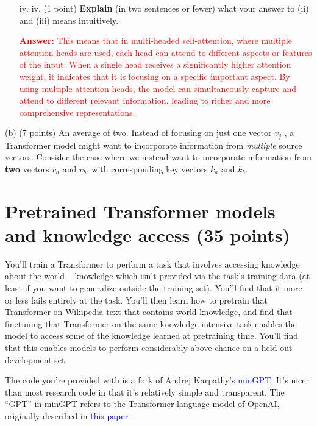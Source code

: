 \documentclass[letterpaper,12pt]{article}
\begin{document}
		\begin{itemize}
			\item [iv.]
			iv. (1 point) \textbf{Explain} (in two sentences or fewer) what your answer to (ii) and (iii) means intuitively.
			
			\textcolor{red}{\textbf{Answer:} This means that in multi-headed self-attention, where multiple attention heads are used, each head can attend to different aspects or features of the input. When a single head receives a significantly higher attention weight, it indicates that it is focusing on a specific important aspect. By using multiple attention heads, the model can simultaneously capture and attend to different relevant information, leading to richer and more comprehensive representations.}
		\end{itemize}
		
		
		
	
		
		
		
	\noindent(b) (7 points) An average of two. Instead of focusing on just one vector $v_j$ , a Transformer model might want to incorporate information from \textit{multiple} source vectors. Consider the case where we instead want to incorporate information from \textbf{two} vectors $v_a$ and $v_b$, with corresponding key vectors $k_a$ and $k_b$.
	
	
	
			
	
	\section{Pretrained Transformer models and knowledge access (35 points)}
	
	You’ll train a Transformer to perform a task that involves accessing knowledge about the world – knowledge which isn’t provided via the task’s training data (at least if you want to generalize outside the training set). You’ll find that it more or less fails entirely at the task. You’ll then learn how to pretrain that Transformer on Wikipedia text that contains world knowledge, and find that finetuning that Transformer on the same knowledge-intensive task enables the model to access some of the knowledge learned at pretraining time. You’ll find that this enables models to perform considerably above chance on a held out development set.
	
	The code you’re provided with is a fork of Andrej Karpathy’s \textcolor{blue}{minGPT}. It’s nicer than most research code in that it’s relatively simple and transparent. The “GPT” in minGPT refers to the Transformer language model of OpenAI, originally described in \textcolor{blue}{this paper} \cite{b1}.
	
\end{document}
